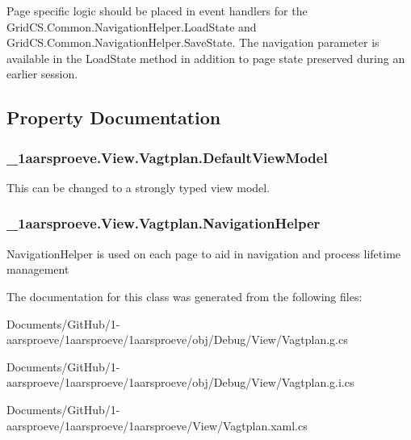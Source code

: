 Page specific logic should be placed in event handlers for the Grid\+C\+S.\+Common.\+Navigation\+Helper.\+Load\+State and Grid\+C\+S.\+Common.\+Navigation\+Helper.\+Save\+State. The navigation parameter is available in the Load\+State method in addition to page state preserved during an earlier session. 

\subsection{Property Documentation}
\hypertarget{class__1aarsproeve_1_1_view_1_1_vagtplan_aa886f262e9d0680645f45daa22bd473a}{}
\subsubsection[{Default\+View\+Model}]{ \+\_\+1aarsproeve.\+View.\+Vagtplan.\+Default\+View\+Model\hspace{0.3cm}{\ttfamily [get]}}\label{class__1aarsproeve_1_1_view_1_1_vagtplan_aa886f262e9d0680645f45daa22bd473a}


This can be changed to a strongly typed view model. 

\hypertarget{class__1aarsproeve_1_1_view_1_1_vagtplan_a8821ea381132cfc4259a782a59201134}{}
\subsubsection[{Navigation\+Helper}]{ \+\_\+1aarsproeve.\+View.\+Vagtplan.\+Navigation\+Helper\hspace{0.3cm}{\ttfamily [get]}}\label{class__1aarsproeve_1_1_view_1_1_vagtplan_a8821ea381132cfc4259a782a59201134}


Navigation\+Helper is used on each page to aid in navigation and process lifetime management 



The documentation for this class was generated from the following files\+:\begin{DoxyCompactItemize}
\item 
Documents/\+Git\+Hub/1-\/aarsproeve/1aarsproeve/1aarsproeve/obj/\+Debug/\+View/Vagtplan.\+g.\+cs\item 
Documents/\+Git\+Hub/1-\/aarsproeve/1aarsproeve/1aarsproeve/obj/\+Debug/\+View/Vagtplan.\+g.\+i.\+cs\item 
Documents/\+Git\+Hub/1-\/aarsproeve/1aarsproeve/1aarsproeve/\+View/Vagtplan.\+xaml.\+cs\end{DoxyCompactItemize}
